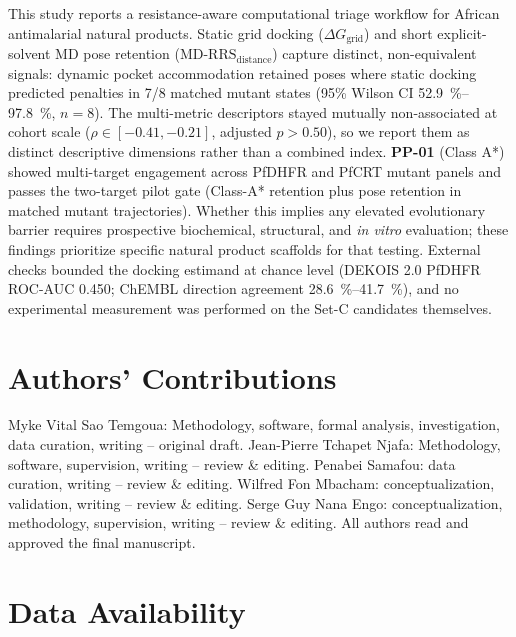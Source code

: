 \documentclass[journal=jcisd8,manuscript=article,layout=traditional]{achemso}
\begin{document}
This study reports a resistance-aware computational triage workflow for African antimalarial natural products. Static grid docking ($\Delta G_{\mathrm{grid}}$) and short explicit-solvent MD pose retention ($\mathrm{MD\text{-}RRS}_{\mathrm{distance}}$) capture distinct, non-equivalent signals: dynamic pocket accommodation retained poses where static docking predicted penalties in 7/8 matched mutant states (95\% Wilson CI \qtyrange{52.9}{97.8}{\percent}, $n=\num{8}$). The multi-metric descriptors stayed mutually non-associated at cohort scale ($\rho \in [-0.41, -0.21]$, adjusted $p > 0.50$), so we report them as distinct descriptive dimensions rather than a combined index. \textbf{PP-01} (Class A*) showed multi-target engagement across PfDHFR and PfCRT mutant panels and passes the two-target pilot gate (Class-A* retention plus pose retention in matched mutant trajectories). Whether this implies any elevated evolutionary barrier requires prospective biochemical, structural, and \textit{in vitro} evaluation; these findings prioritize specific natural product scaffolds for that testing. External checks bounded the docking estimand at chance level (DEKOIS 2.0 PfDHFR ROC-AUC \num{0.450}; ChEMBL direction agreement \qtyrange{28.6}{41.7}{\percent}), and no experimental measurement was performed on the Set-C candidates themselves.


\section*{Authors' Contributions}

Myke Vital Sao Temgoua: Methodology, software, formal analysis, investigation, data curation, writing -- original draft. Jean-Pierre Tchapet Njafa: Methodology, software, supervision, writing -- review \& editing. Penabei Samafou: data curation, writing -- review \& editing. Wilfred Fon Mbacham: conceptualization, validation, writing -- review \& editing. Serge Guy Nana Engo: conceptualization, methodology, supervision, writing -- review \& editing. All authors read and approved the final manuscript.

\section*{Data Availability}
\end{document}

